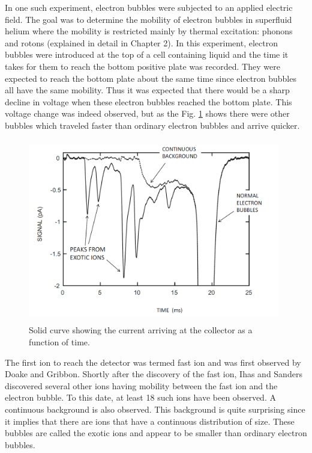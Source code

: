 In one such experiment, electron bubbles were subjected to an applied electric field. \cite{Wei2016} The goal was to determine the mobility of electron bubbles in superfluid helium where the mobility is restricted mainly by thermal excitation: phonons and rotons (explained in detail in Chapter 2). In this experiment, electron bubbles were introduced at the top of a cell containing liquid and the time it takes for them to reach the bottom positive plate was recorded. They were expected to reach the bottom plate about the same time since electron bubbles all have the same mobility. Thus it was expected that there would be a sharp decline in voltage when these electron bubbles reached the bottom plate. This voltage change was indeed observed, but as the Fig. \ref{exo_ions} shows there were other bubbles which traveled faster than ordinary electron bubbles and arrive quicker.  
\begin{figure}[H]
\centering 
\includegraphics[width=110mm, height=80mm]{Introduction/exo_ions.png}
\caption{Solid curve showing the current arriving at the collector as a function of time. \cite{Wei2016}}
\label{exo_ions}
\end{figure}

The first ion to reach the detector was termed fast ion and was first observed by Doake and Gribbon. Shortly after the discovery of the fast ion, Ihas and Sanders discovered several other ions having mobility between the fast ion and the electron bubble. To this date, at least 18 such ions have been observed. A continuous background is also observed. This background is quite surprising since it implies that there are ions that have a continuous distribution of size. These bubbles are called the exotic ions and appear to be smaller than ordinary electron bubbles.

